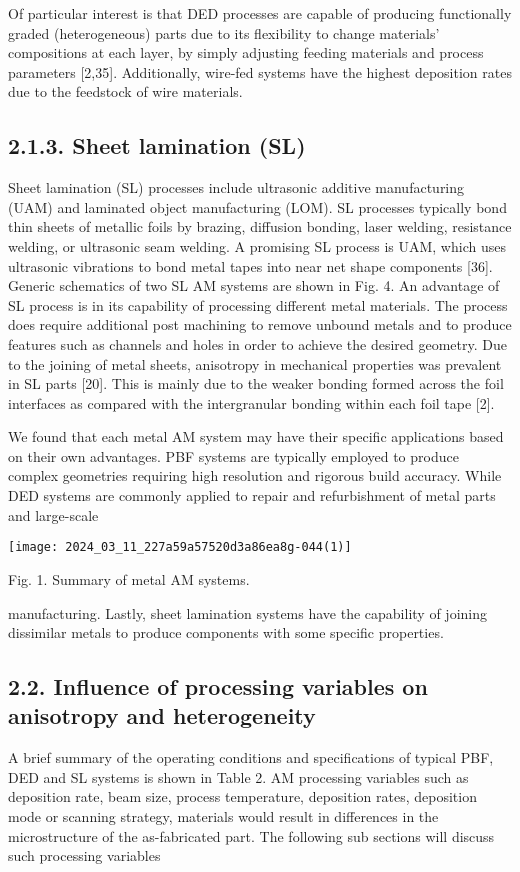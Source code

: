 \documentclass[10pt]{article}
\begin{document}
Of particular interest is that DED processes are capable of producing functionally graded (heterogeneous) parts due to its flexibility to change materials' compositions at each layer, by simply adjusting feeding materials and process parameters [2,35]. Additionally, wire-fed systems have the highest deposition rates due to the feedstock of wire materials.

\subsection*{2.1.3. Sheet lamination (SL)}
Sheet lamination (SL) processes include ultrasonic additive manufacturing (UAM) and laminated object manufacturing (LOM). SL processes typically bond thin sheets of metallic foils by brazing, diffusion bonding, laser welding, resistance welding, or ultrasonic seam welding. A promising SL process is UAM, which uses ultrasonic vibrations to bond metal tapes into near net shape components [36]. Generic schematics of two SL AM systems are shown in Fig. 4. An advantage of SL process is in its capability of processing different metal materials. The process does require additional post machining to remove unbound metals and to produce features such as channels and holes in order to achieve the desired geometry. Due to the joining of metal sheets, anisotropy in mechanical properties was prevalent in SL parts [20]. This is mainly due to the weaker bonding formed across the foil interfaces as compared with the intergranular bonding within each foil tape [2].

We found that each metal AM system may have their specific applications based on their own advantages. PBF systems are typically employed to produce complex geometries requiring high resolution and rigorous build accuracy. While DED systems are commonly applied to repair and refurbishment of metal parts and large-scale

\begin{center}
\texttt{[image: 2024\_03\_11\_227a59a57520d3a86ea8g-044(1)]}
\end{center}

Fig. 1. Summary of metal AM systems.

manufacturing. Lastly, sheet lamination systems have the capability of joining dissimilar metals to produce components with some specific properties.

\subsection*{2.2. Influence of processing variables on anisotropy and heterogeneity}
A brief summary of the operating conditions and specifications of typical PBF, DED and SL systems is shown in Table 2. AM processing variables such as deposition rate, beam size, process temperature, deposition rates, deposition mode or scanning strategy, materials would result in differences in the microstructure of the as-fabricated part. The following sub sections will discuss such processing variables
\end{document}
